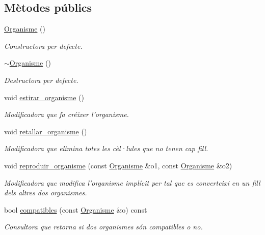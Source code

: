 \subsection*{Mètodes públics}
\begin{DoxyCompactItemize}
\item 
\hyperlink{class_organisme_a5624eb8adf14bc96d783067d51605fbd}{Organisme} ()
\begin{DoxyCompactList}\small\item\em Constructora per defecte. \end{DoxyCompactList}\item 
\hyperlink{class_organisme_a55c9d7cbc9683970ad88455fdc3be7aa}{$\sim$\-Organisme} ()
\begin{DoxyCompactList}\small\item\em Destructora per defecte. \end{DoxyCompactList}\item 
void \hyperlink{class_organisme_a41a2ea17f4287dc3d00a45476a602309}{estirar\-\_\-organisme} ()
\begin{DoxyCompactList}\small\item\em Modificadora que fa créixer l'organisme. \end{DoxyCompactList}\item 
void \hyperlink{class_organisme_a3db36c1cb9d93f2750fd033b137dc702}{retallar\-\_\-organisme} ()
\begin{DoxyCompactList}\small\item\em Modificadora que elimina totes les cèl·lules que no tenen cap fill. \end{DoxyCompactList}\item 
void \hyperlink{class_organisme_ad2f37457376d9686751e69d45607731b}{reproduir\-\_\-organisme} (const \hyperlink{class_organisme}{Organisme} \&o1, const \hyperlink{class_organisme}{Organisme} \&o2)
\begin{DoxyCompactList}\small\item\em Modificadora que modifica l'organisme implícit per tal que es converteixi en un fill dels altres dos organismes. \end{DoxyCompactList}\item 
bool \hyperlink{class_organisme_a4706d097ab7348c9161cc8f8a5052418}{compatibles} (const \hyperlink{class_organisme}{Organisme} \&o) const 
\begin{DoxyCompactList}\small\item\em Consultora que retorna si dos organismes són compatibles o no. \end{DoxyCompactList}\item 

\end{DoxyCompactItemize}
